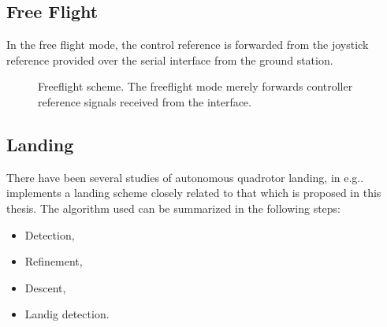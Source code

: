 
        \subsection{Free Flight}
            In the free flight mode, the control reference is forwarded
            from the joystick reference provided over the serial interface
            from the ground station.

            \begin{figure}[H]
                \noindent{}
                \caption{Freeflight scheme. The freeflight mode merely forwards controller reference signals received from the interface.}
                \label{fig:logic:freeflightscheme}
            \end{figure}

        \subsection{Landing}
            \label{ssec:logic:landing}
            There have been several studies of autonomous quadrotor landing,
            in e.g.\citep{mellinger10perching,brockers:803111}.
            \citep{brockers:803111} implements a landing scheme closely related to
            that which is proposed in this thesis.
            The algorithm used can be summarized in the following steps:
            \begin{itemize}
                \item Detection,
                \item Refinement,
                \item Descent,
                \item Landig detection.
            \end{itemize}

